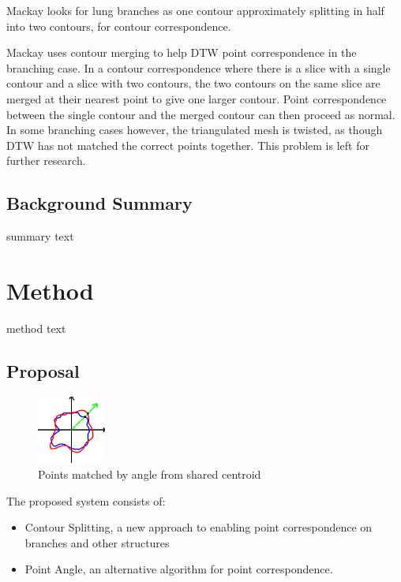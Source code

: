 \documentclass[11p, titlepage]{article}
\begin{document}
Mackay \cite{mackay2019robust} looks for lung branches as one contour approximately splitting in half into two contours, for contour correspondence.

Mackay \cite{mackay2019robust} uses contour merging to help DTW point correspondence in the branching case. In a contour correspondence where there is a slice with a single contour and a slice with two contours, the two contours on the same slice are merged at their nearest point to give one larger contour. Point correspondence between the single contour and the merged contour can then proceed as normal. In some branching cases however, the triangulated mesh is twisted, as though DTW has not matched the correct points together. This problem is left for further research.

\subsection{Background Summary}

summary text

\section{Method}

method text

\subsection{Proposal}

\begin{figure}
\centering
\includegraphics[width=0.2\textwidth]{pa}
\caption{Points matched by angle from shared centroid\label{fig:pa}}
\end{figure}

The proposed system consists of:
\begin{itemize}
\item Contour Splitting, a new approach to enabling point correspondence on branches and other structures
\item Point Angle, an alternative algorithm for point correspondence.
\end{itemize}
\end{document}
